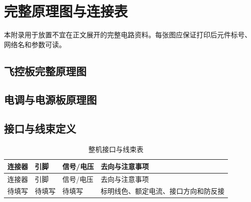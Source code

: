 \chapter{完整原理图与连接表}

本附录用于放置不宜在正文展开的完整电路资料。每张图应保证打印后元件标号、网络名和参数可读。

\section{飞控板完整原理图}

\section{电调与电源板原理图}

\section{接口与线束定义}
\begin{longtable}{p{2.6cm}p{2.6cm}p{3.4cm}p{4.0cm}}
\caption{整机接口与线束表}\label{tab:wiring}\\
\toprule
连接器 & 引脚 & 信号/电压 & 去向与注意事项 \\
\midrule
\endfirsthead
\toprule
连接器 & 引脚 & 信号/电压 & 去向与注意事项 \\
\midrule
\endhead
待填写 & 待填写 & 待填写 & 标明线色、额定电流、接口方向和防反接 \\
\bottomrule
\end{longtable}

